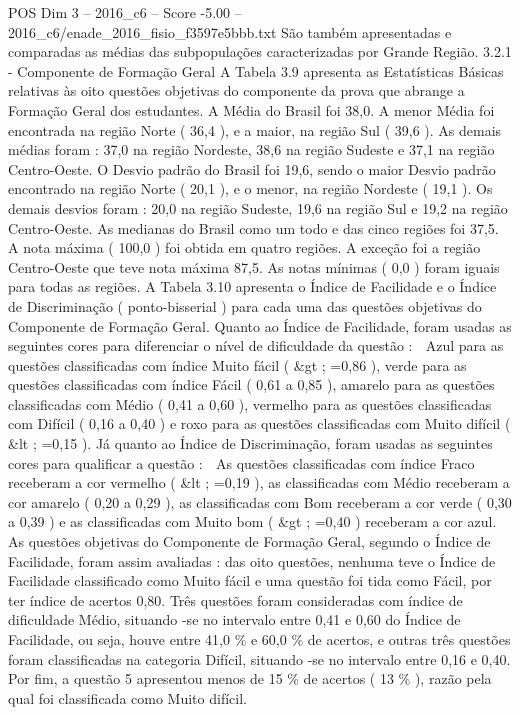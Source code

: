 \begin{textsample}{POS Dim 3 – 2016\_c6 – Score -5.00 – 2016\_c6/enade\_2016\_fisio\_f3597e5bbb.txt}
São também apresentadas e comparadas as médias das subpopulações caracterizadas por Grande Região. 3.2.1 - Componente de Formação Geral A Tabela 3.9 apresenta as Estatísticas Básicas relativas às oito questões objetivas do componente da prova que abrange a Formação Geral dos estudantes.
A Média do Brasil foi 38,0.
A menor Média foi encontrada na região Norte ( 36,4 ), e a maior, na região Sul ( 39,6 ).
As demais médias foram : 37,0 na região Nordeste, 38,6 na região Sudeste e 37,1 na região Centro-Oeste.
O Desvio padrão do Brasil foi 19,6, sendo o maior Desvio padrão encontrado na região Norte ( 20,1 ), e o menor, na região Nordeste ( 19,1 ).
Os demais desvios foram : 20,0 na região Sudeste, 19,6 na região Sul e 19,2 na região Centro-Oeste.
As medianas do Brasil como um todo e das cinco regiões foi 37,5.
A nota máxima ( 100,0 ) foi obtida em quatro regiões.
A exceção foi a região Centro-Oeste que teve nota máxima 87,5.
As notas mínimas ( 0,0 ) foram iguais para todas as regiões.
A Tabela 3.10 apresenta o Índice de Facilidade e o Índice de Discriminação ( ponto-bisserial ) para cada uma das questões objetivas do Componente de Formação Geral.
Quanto ao Índice de Facilidade, foram usadas as seguintes cores para diferenciar o nível de dificuldade da questão :  Azul para as questões classificadas com índice Muito fácil ( \&gt ; =0,86 ), verde para as questões classificadas com índice Fácil ( 0,61 a 0,85 ), amarelo para as questões classificadas com Médio ( 0,41 a 0,60 ), vermelho para as questões classificadas com Difícil ( 0,16 a 0,40 ) e roxo para as questões classificadas com Muito difícil ( \&lt ; =0,15 ).
Já quanto ao Índice de Discriminação, foram usadas as seguintes cores para qualificar a questão :  As questões classificadas com índice Fraco receberam a cor vermelho ( \&lt ; =0,19 ), as classificadas com Médio receberam a cor amarelo ( 0,20 a 0,29 ), as classificadas com Bom receberam a cor verde ( 0,30 a 0,39 ) e as classificadas com Muito bom ( \&gt ; =0,40 ) receberam a cor azul.
As questões objetivas do Componente de Formação Geral, segundo o Índice de Facilidade, foram assim avaliadas : das oito questões, nenhuma teve o Índice de Facilidade classificado como Muito fácil e uma questão foi tida como Fácil, por ter índice de acertos 0,80.
Três questões foram consideradas com índice de dificuldade Médio, situando -se no intervalo entre 0,41 e 0,60 do Índice de Facilidade, ou seja, houve entre 41,0 \% e 60,0 \% de acertos, e outras três questões foram classificadas na categoria Difícil, situando -se no intervalo entre 0,16 e 0,40.
Por fim, a questão 5 apresentou menos de 15 \% de acertos ( 13 \% ), razão pela qual foi classificada como Muito difícil.

\end{textsample}
